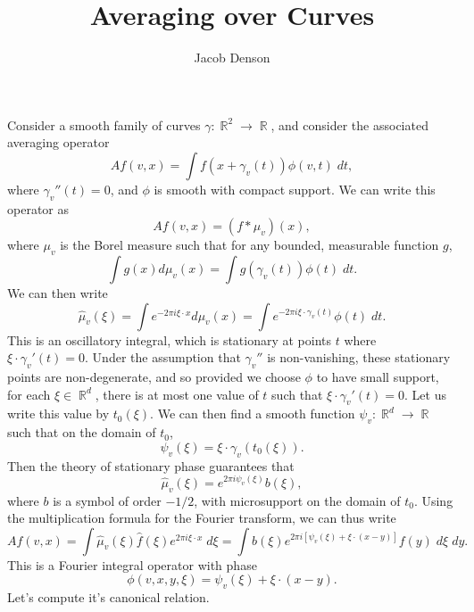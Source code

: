 \documentclass{article}
\title{Averaging over Curves}
\author{Jacob Denson}
\theoremstyle{plain}
\theoremstyle{remark}
\theoremstyle{definition}
\DeclareMathOperator{\RR}{\mathbb{R}}
\begin{document}
\maketitle

Consider a smooth family of curves $\gamma: \RR^2 \to \RR$, and consider the associated averaging operator
%
\[ Af(v,x) = \int f(x + \gamma_v(t)) \phi(v,t)\; dt, \]
%
where $\gamma_v''(t) = 0$, and $\phi$ is smooth with compact support. We can write this operator as
%
\[ Af(v,x) = (f * \mu_v)(x), \]
%
where $\mu_v$ is the Borel measure such that for any bounded, measurable function $g$,
%
\[ \int g(x) d\mu_v(x) = \int g(\gamma_v(t)) \phi(t)\; dt. \]
%
We can then write
%
\[ \widehat{\mu}_v(\xi) = \int e^{-2 \pi i \xi \cdot x} d\mu_v(x) = \int e^{-2 \pi i \xi \cdot \gamma_v(t)} \phi(t)\; dt. \]
%
This is an oscillatory integral, which is stationary at points $t$ where $\xi \cdot \gamma_v'(t) = 0$. Under the assumption that $\gamma_v''$ is non-vanishing, these stationary points are non-degenerate, and so provided we choose $\phi$ to have small support, for each $\xi \in \RR^d$, there is at most one value of $t$ such that $\xi \cdot \gamma_v'(t) = 0$. Let us write this value by $t_0(\xi)$. We can then find a smooth function $\psi_v: \RR^d \to \RR$ such that on the domain of $t_0$,
%
\[ \psi_v(\xi) = \xi \cdot \gamma_v(t_0(\xi)). \]
%
Then the theory of stationary phase guarantees that
%
\[ \widehat{\mu}_v(\xi) = e^{2 \pi i \psi_v(\xi)} b(\xi), \]
%
where $b$ is a symbol of order $-1/2$, with microsupport on the domain of $t_0$. Using the multiplication formula for the Fourier transform, we can thus write
%
\[ Af(v,x) = \int \widehat{\mu}_v(\xi) \widehat{f}(\xi) e^{2 \pi i \xi \cdot x}\; d\xi = \int b(\xi) e^{2 \pi i [\psi_v(\xi) + \xi \cdot (x - y)]} f(y)\; d\xi\; dy. \]
%
This is a Fourier integral operator with phase
%
\[ \phi(v,x,y,\xi) = \psi_v(\xi) + \xi \cdot (x - y). \]
%
Let's compute it's canonical relation.
\end{document}
